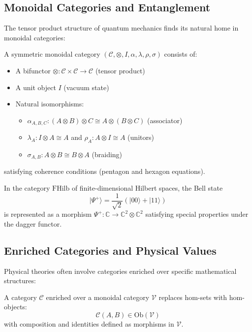 \subsection{Monoidal Categories and Entanglement}

The tensor product structure of quantum mechanics finds its natural home in monoidal categories:

\begin{definition}
A symmetric monoidal category $(\mathcal{C}, \otimes, I, \alpha, \lambda, \rho, \sigma)$ consists of:
\begin{itemize}
\item A bifunctor $\otimes: \mathcal{C} \times \mathcal{C} \to \mathcal{C}$ (tensor product)
\item A unit object $I$ (vacuum state)
\item Natural isomorphisms:
  \begin{itemize}
  \item $\alpha_{A,B,C}: (A \otimes B) \otimes C \cong A \otimes (B \otimes C)$ (associator)
  \item $\lambda_A: I \otimes A \cong A$ and $\rho_A: A \otimes I \cong A$ (unitors)
  \item $\sigma_{A,B}: A \otimes B \cong B \otimes A$ (braiding)
  \end{itemize}
\end{itemize}
satisfying coherence conditions (pentagon and hexagon equations).
\end{definition}

\begin{example}
In the category $\text{FHilb}$ of finite-dimensional Hilbert spaces, the Bell state
\[
|\Psi^+\rangle = \frac{1}{\sqrt{2}}(|00\rangle + |11\rangle)
\]
is represented as a morphism $\Psi^+: \mathbb{C} \to \mathbb{C}^2 \otimes \mathbb{C}^2$ satisfying special properties under the dagger functor.
\end{example}

\subsection{Enriched Categories and Physical Values}

Physical theories often involve categories enriched over specific mathematical structures:

\begin{definition}
A category $\mathcal{C}$ enriched over a monoidal category $\mathcal{V}$ replaces hom-sets with hom-objects:
\[
\mathcal{C}(A,B) \in \text{Ob}(\mathcal{V})
\]
with composition and identities defined as morphisms in $\mathcal{V}$.
\end{definition}

